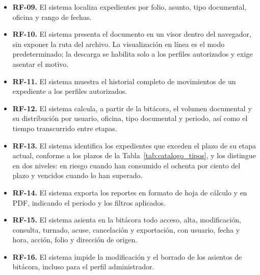 \begin{description}[leftmargin=0pt,font=\bfseries,itemsep=0.6em,parsep=0pt]
  \item[M3. Consulta y visualización]\leavevmode
  \begin{itemize}[nosep,leftmargin=1.4em,topsep=1pt]
    \item \textbf{RF-09.} El sistema localiza expedientes por folio, asunto, tipo documental, oficina y rango de fechas.
    \item \textbf{RF-10.} El sistema presenta el documento en un visor dentro del navegador, sin exponer la ruta del archivo. La visualización en línea es el modo predeterminado; la descarga se habilita solo a los perfiles autorizados y exige asentar el motivo.
    \item \textbf{RF-11.} El sistema muestra el historial completo de movimientos de un expediente a los perfiles autorizados.
  \end{itemize}

  \item[M4. Control estadístico]\leavevmode
  \begin{itemize}[nosep,leftmargin=1.4em,topsep=1pt]
    \item \textbf{RF-12.} El sistema calcula, a partir de la bitácora, el volumen documental y su distribución por usuario, oficina, tipo documental y periodo, así como el tiempo transcurrido entre etapas.
    \item \textbf{RF-13.} El sistema identifica los expedientes que exceden el plazo de su etapa actual, conforme a los plazos de la Tabla~\ref{tab:catalogo_tipos}, y los distingue en dos niveles: en riesgo cuando han consumido el ochenta por ciento del plazo y vencidos cuando lo han superado.
    \item \textbf{RF-14.} El sistema exporta los reportes en formato de hoja de cálculo y en PDF, indicando el periodo y los filtros aplicados.
  \end{itemize}

  \item[M5. Bitácora y auditoría]\leavevmode
  \begin{itemize}[nosep,leftmargin=1.4em,topsep=1pt]
    \item \textbf{RF-15.} El sistema asienta en la bitácora todo acceso, alta, modificación, consulta, turnado, acuse, cancelación y exportación, con usuario, fecha y hora, acción, folio y dirección de origen.
    \item \textbf{RF-16.} El sistema impide la modificación y el borrado de los asientos de bitácora, incluso para el perfil administrador.
  \end{itemize}


\end{description}
